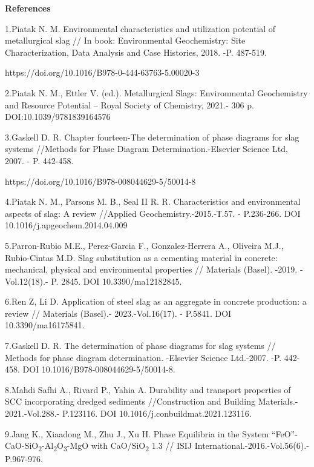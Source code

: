 \begin{center}
{\bfseries References}
\end{center}

\begin{noparindent}
1.Piatak N. M. Environmental characteristics and utilization potential
of metallurgical slag // In book: Environmental Geochemistry: Site
Characterization, Data Analysis and Case Histories, 2018. -P. 487-519.

https://doi.org/10.1016/B978-0-444-63763-5.00020-3

2.Piatak N. M., Ettler V. (ed.). Metallurgical Slags: Environmental
Geochemistry and Resource Potential -- Royal Society of Chemistry,
2021.- 306 p. DOI:10.1039/9781839164576

3.Gaskell D. R. Chapter fourteen-The determination of phase diagrams for
slag systems //Methods for Phase Diagram Determination.-Elsevier Science
Ltd, 2007. - P. 442-458.

https://doi.org/10.1016/B978-008044629-5/50014-8

4.Piatak N. M., Parsons M. B., Seal II R. R. Characteristics and
environmental aspects of slag: A review //Applied
Geochemistry.-2015.-Т.57. - P.236-266. DOI
10.1016/j.apgeochem.2014.04.009

5.Parron-Rubio M.E., Perez-Garcia F., Gonzalez-Herrera A., Oliveira
M.J., Rubio-Cintas M.D. Slag substitution as a cementing material in
concrete: mechanical, physical and environmental properties // Materials
(Basel). -2019. - Vol.12(18).- P. 2845. DOI 10.3390/ma12182845.

6.Ren Z, Li D. Application of steel slag as an aggregate in concrete
production: a review // Materials (Basel).- 2023.-Vol.16(17). - P.5841.
DOI 10.3390/ma16175841.

7.Gaskell D. R. The determination of phase diagrams for slag systems //
Methods for phase diagram determination. -Elsevier Science Ltd.-2007.
-P. 442-458. DOI 10.1016/B978-008044629-5/50014-8.

8.Mahdi Safhi A., Rivard P., Yahia A. Durability and transport
properties of SCC incorporating dredged sediments //Construction and
Building Materials.- 2021.-Vol.288.- P.123116. DOI
10.1016/j.conbuildmat.2021.123116.

9.Jang K., Xiaadong M., Zhu J., Xu H. Phase Equilibria in the System
``FeO''-CaO-SiO\textsubscript{2}-Al\textsubscript{2}O\textsubscript{3}-MgO
with CaO/SiO\textsubscript{2} 1.3 // ISIJ
International.-2016.-Vol.56(6).-P.967-976.


\end{noparindent}
